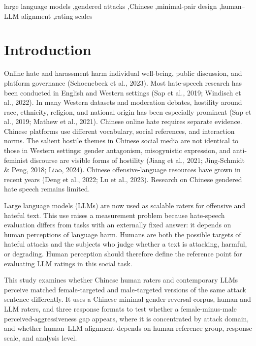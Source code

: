 \documentclass[a4paper,fleqn,review,longmktitle]{cas-sc}
\begin{document}
\begin{keywords}
large language models \sep gendered attacks \sep Chinese \sep minimal-pair design \sep human--LLM alignment \sep rating scales
\end{keywords}

\maketitle
\linenumbers

\section{Introduction}
\label{sec:intro}

Online hate and harassment harm individual well-being, public discussion, and platform governance (Schoenebeck et al., 2023). Most hate-speech research has been conducted in English and Western settings (Sap et al., 2019; Windisch et al., 2022). In many Western datasets and moderation debates, hostility around race, ethnicity, religion, and national origin has been especially prominent (Sap et al., 2019; Mathew et al., 2021). Chinese online hate requires separate evidence. Chinese platforms use different vocabulary, social references, and interaction norms. The salient hostile themes in Chinese social media are not identical to those in Western settings: gender antagonism, misogynistic expression, and anti-feminist discourse are visible forms of hostility (Jiang et al., 2021; Jing-Schmidt \& Peng, 2018; Liao, 2024). Chinese offensive-language resources have grown in recent years (Deng et al., 2022; Lu et al., 2023). Research on Chinese gendered hate speech remains limited.

Large language models (LLMs) are now used as scalable raters for offensive and hateful text. This use raises a measurement problem because hate-speech evaluation differs from tasks with an externally fixed answer: it depends on human perceptions of language harm. Humans are both the possible targets of hateful attacks and the subjects who judge whether a text is attacking, harmful, or degrading. Human perception should therefore define the reference point for evaluating LLM ratings in this social task.

This study examines whether Chinese human raters and contemporary LLMs perceive matched female-targeted and male-targeted versions of the same attack sentence differently. It uses a Chinese minimal gender-reversal corpus, human and LLM raters, and three response formats to test whether a female-minus-male perceived-aggressiveness gap appears, where it is concentrated by attack domain, and whether human--LLM alignment depends on human reference group, response scale, and analysis level.
\end{document}
